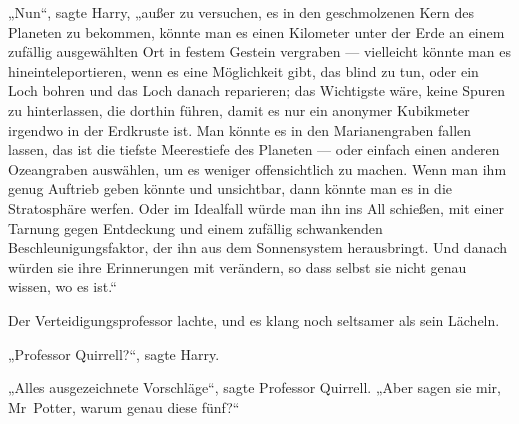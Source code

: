 „Nun“, sagte Harry, „außer zu versuchen, es in den geschmolzenen Kern des Planeten zu bekommen, könnte man es einen Kilometer unter der Erde an einem zufällig ausgewählten Ort in festem Gestein vergraben — vielleicht könnte man es hineinteleportieren, wenn es eine Möglichkeit gibt, das blind zu tun, oder ein Loch bohren und das Loch danach reparieren; das Wichtigste wäre, keine Spuren zu hinterlassen, die dorthin führen, damit es nur ein anonymer Kubikmeter irgendwo in der Erdkruste ist. Man könnte es in den Marianengraben fallen lassen, das ist die tiefste Meerestiefe des Planeten — oder einfach einen anderen Ozeangraben auswählen, um es weniger offensichtlich zu machen. Wenn man ihm genug Auftrieb geben könnte und unsichtbar, dann könnte man es in die Stratosphäre werfen. Oder im Idealfall würde man ihn ins All schießen, mit einer Tarnung gegen Entdeckung und einem zufällig schwankenden Beschleunigungsfaktor, der ihn aus dem Sonnensystem herausbringt. Und danach würden sie ihre Erinnerungen mit  verändern, so dass selbst sie nicht genau wissen, wo es ist.“

Der Verteidigungsprofessor lachte, und es klang noch seltsamer als sein Lächeln.

„Professor Quirrell?“, sagte Harry.

„Alles ausgezeichnete Vorschläge“, sagte Professor Quirrell.
„Aber sagen sie mir, Mr~Potter, warum genau diese fünf?“

